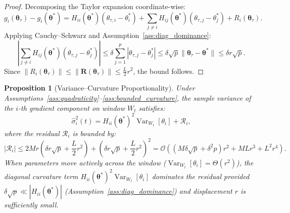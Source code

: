 \documentclass[11pt,a4paper]{article}
\newtheorem{proposition}{Proposition}
\begin{document}
\begin{proof}
Decomposing the Taylor expansion coordinate-wise:
\begin{equation}
g_i(\boldsymbol{\theta}_\tau) - g_i(\boldsymbol{\theta}^*) = H_{ii}(\boldsymbol{\theta}^*)(\theta_{\tau,i} - \theta_i^*) + \sum_{j \ne i} H_{ij}(\boldsymbol{\theta}^*)(\theta_{\tau,j} - \theta_j^*) + R_i(\boldsymbol{\theta}_\tau).
\end{equation}
Applying Cauchy--Schwarz and Assumption~\ref{ass:diag_dominance}:
\begin{equation}
\left| \sum_{j \ne i} H_{ij}(\boldsymbol{\theta}^*)(\theta_{\tau,j} - \theta_j^*) \right| \le \delta \sum_{j=1}^p |\theta_{\tau,j} - \theta_j^*| \le \delta \sqrt{p} \|\boldsymbol{\theta}_\tau - \boldsymbol{\theta}^*\| \le \delta r \sqrt{p}.
\end{equation}
Since $\|R_i(\boldsymbol{\theta}_\tau)\| \le \|\mathbf{R}(\boldsymbol{\theta}_\tau)\| \le \frac{L}{2} r^2$, the bound follows.
\end{proof}

\begin{proposition}[Variance--Curvature Proportionality]
\label{prop:variance_curvature}
Under Assumptions~\ref{ass:quadraticity}--\ref{ass:bounded_curvature}, the sample variance of the $i$-th gradient component on window $W_t$ satisfies:
\begin{equation}
\hat{\sigma}_i^2(t) = H_{ii}(\boldsymbol{\theta}^*)^2 \operatorname{Var}_{W_t}[\theta_i] + \mathcal{R}_i,
\end{equation}
where the residual $\mathcal{R}_i$ is bounded by:
\begin{equation}
|\mathcal{R}_i| \le 2 M r \left( \delta r \sqrt{p} + \frac{L}{2} r^2 \right) + \left( \delta r \sqrt{p} + \frac{L}{2} r^2 \right)^2 = \mathcal{O}\left( (M \delta \sqrt{p} + \delta^2 p) r^2 + M L r^3 + L^2 r^4 \right).
\label{eq:prop1_remainder}
\end{equation}
When parameters move actively across the window ($\operatorname{Var}_{W_t}[\theta_i] = \Theta(r^2)$), the diagonal curvature term $H_{ii}(\boldsymbol{\theta}^*)^2 \operatorname{Var}_{W_t}[\theta_i]$ dominates the residual provided $\delta \sqrt{p} \ll |H_{ii}(\boldsymbol{\theta}^*)|$ (Assumption~\ref{ass:diag_dominance}) and displacement $r$ is sufficiently small.
\end{proposition}
\end{document}
